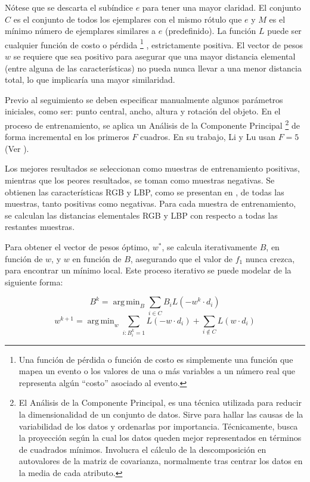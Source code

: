 \documentclass[a4paper,10pt]{article}
\DeclareMathOperator*{\argmin}{arg\,min}
\begin{document}
Nótese que se descarta el subíndice $e$ para tener una mayor claridad.
El conjunto $C$ es el conjunto de todos los ejemplares con el mismo rótulo que $e$ y $M$
es el mínimo número de ejemplares similares a $e$ (predefinido). La función $L$ puede ser
cualquier función de costo o pérdida
\footnote{Una función de pérdida o función de costo es simplemente una función que mapea un evento o los valores de una o más variables
a un número real que representa algún ``costo'' asociado al evento.}
, estrictamente positiva.
El vector de pesos $w$
se requiere que sea positivo para asegurar que una mayor distancia elemental (entre
alguna de las características) no pueda nunca llevar a una menor distancia total,
lo que implicaría una mayor similaridad.

Previo al seguimiento se deben especificar manualmente algunos parámetros iniciales,
como ser: punto central, ancho, altura y rotación del objeto. En el proceso de
entrenamiento, se aplica un Análisis de la Componente Principal
\footnote{El Análisis de la Componente Principal, es una técnica utilizada para reducir la dimensionalidad de un conjunto de datos.
Sirve para hallar las causas de la variabilidad de los datos y ordenarlas por importancia.
Técnicamente, busca la proyección según la cual los datos queden mejor representados en términos de cuadrados mínimos. Involucra el cálculo de la descomposición en
autovalores de la matriz de covarianza, normalmente tras centrar los datos en la media de cada atributo.}
de forma incremental en los primeros $F$ cuadros. En su trabajo, Li y Lu usan
$F = 5$ (Ver \cite{local-learning}).

Los mejores resultados se seleccionan como muestras de entrenamiento positivas, mientras que
los peores resultados, se toman como muestras negativas. Se obtienen las características
RGB y LBP, como se presentan en \cite{tracking-bag-of-features}, de todas las muestras,
tanto positivas como negativas. Para cada muestra de entrenamiento, se calculan las
distancias elementales RGB y LBP con respecto a todas las restantes muestras.

Para obtener el vector de pesos óptimo, $w^{*}$, se calcula iterativamente $B$,
en función de $w$, y $w$ en función de $B$, asegurando que el valor de $f_{1}$ nunca
crezca, para encontrar un mínimo local. Este proceso iterativo se puede modelar de la
siguiente forma:

\begin{equation}
   \label{eq:local-learning-B-k}
   B^{k} = \argmin_{B} \sum_{i \in C} B_{i}L(-w^{k} \cdot d_{i})
\end{equation}
\begin{equation}
    \label{eq:local-learning-w-k}
    w^{k+1} = \argmin_{w} \sum_{i:B_{i}^{k}=1} L(-w \cdot d_{i}) + \sum_{i\notin C}L(w \cdot d_{i})
\end{equation}
\end{document}
